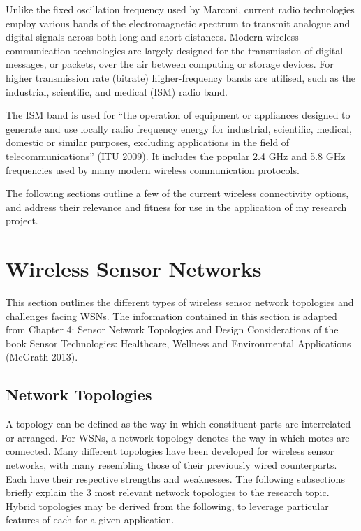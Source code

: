 Unlike the fixed oscillation frequency used by Marconi, current radio technologies employ various bands of the electromagnetic spectrum to transmit analogue and digital signals across both long and short distances. Modern wireless communication technologies are largely designed for the transmission of digital messages, or packets, over the air between computing or storage devices. For higher transmission rate (bitrate) higher-frequency bands are utilised, such as the industrial, scientific, and medical (ISM) radio band.

The ISM band is used for “the operation of equipment or appliances designed to generate and use locally radio frequency energy for industrial, scientific, medical, domestic or similar purposes, excluding applications in the field of telecommunications” (ITU 2009). It includes the popular 2.4 GHz and 5.8 GHz frequencies used by many modern wireless communication protocols.

The following sections outline a few of the current wireless connectivity options, and address their relevance and fitness for use in the application of my research project.



\section{Wireless Sensor Networks}

This section outlines the different types of wireless sensor network topologies and challenges facing WSNs. The information contained in this section is adapted from Chapter 4: Sensor Network Topologies and Design Considerations of the book Sensor Technologies: Healthcare, Wellness and Environmental Applications (McGrath 2013).


\subsection{Network Topologies}

A topology can be defined as the way in which constituent parts are interrelated or arranged. For WSNs, a network topology denotes the way in which motes are connected. Many different topologies have been developed for wireless sensor networks, with many resembling those of their previously wired counterparts. Each have their respective strengths and weaknesses. The following subsections briefly explain the 3 most relevant network topologies to the research topic. Hybrid topologies may be derived from the following, to leverage particular features of each for a given application.

